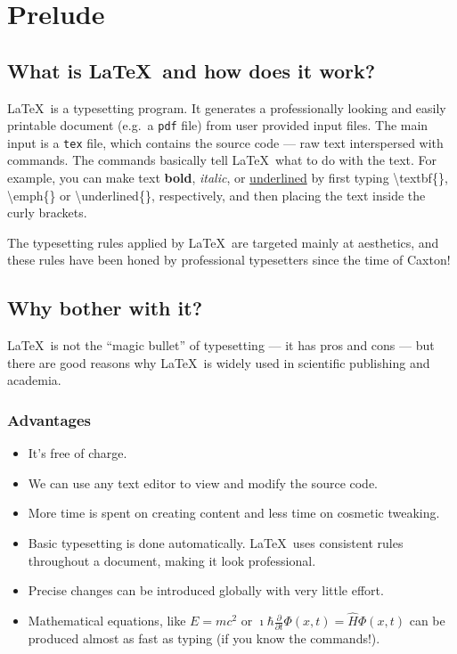 \chapter{Prelude}
\label{chap:prelude}
\section{What is \LaTeX\ and how does it work?}
\LaTeX\ is a typesetting program. It generates a professionally looking and easily printable document (e.g.~a {\tt pdf} file) from user provided input files. The main input is a {\tt tex} file, which contains the source code --- raw text interspersed with commands. The commands basically tell \LaTeX\ what to do with the text. For example, you can make text \textbf{bold}, \emph{italic}, or \underline{underlined} by first typing {\textbackslash}textbf\{\}, {\textbackslash}emph\{\} or {\textbackslash}underlined\{\}, respectively, and then placing the text inside the curly brackets.

The typesetting rules applied by \LaTeX\ are targeted mainly at aesthetics, and these rules have been honed by professional typesetters since the time of Caxton!

\section{Why bother with it?}
\LaTeX\ is not the ``magic bullet'' of typesetting --- it has pros and cons --- but there are good reasons why \LaTeX\ is widely used in scientific publishing and academia.  
\subsection{Advantages}
\begin{itemize}
\item It's free of charge.
\item We can use any text editor to view and modify the source code.
\item More time is spent on creating content and less time on cosmetic tweaking.
\item Basic typesetting is done automatically. \LaTeX\ uses consistent rules throughout a document, making it look professional.
\item Precise changes can be introduced globally with very little effort.
\item Mathematical equations, like $E=mc^2$ or $\imath\hbar\frac{\partial}{\partial t}\Phi (x, t) = \hat{H}\Phi (x, t)$ can be produced almost as fast as typing (if you know the commands!).
\end{itemize}

